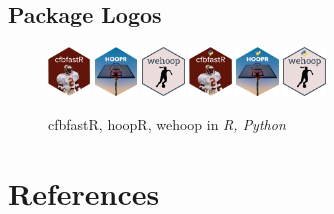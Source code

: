 \documentclass[12pt]{article}
\begin{document}
\newpage
\subsection{Package Logos}\begin{figure}[htbp]
    \centering
    \caption{cfbfastR, hoopR, wehoop in \textit{R, Python}}
    \centering
    \includegraphics[width=0.1\textwidth]{./figures/cfbfastR.png}
    \includegraphics[width=0.1\textwidth]{./figures/hoopR.png}
    \includegraphics[width=0.1\textwidth]{./figures/wehoop.png}
    \includegraphics[width=0.1\textwidth]{./figures/cfbfastR-py.png}
    \includegraphics[width=0.1\textwidth]{./figures/hoopR-py.png}
    \includegraphics[width=0.1\textwidth]{./figures/wehoop-py.png}
    \label{fig:sdvR}
\end{figure} 
\newpage
\section{References}
\printbibliography[title={\hspace{5pt}\vspace{-10pt}}]
\end{document}
